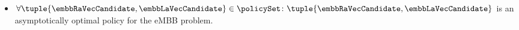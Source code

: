 \begin{frame}
  \begin{itemize}
    \item $\forall\tuple{\embbRaVecCandidate, \embbLaVecCandidate} \in \policySet \colon \tuple{\embbRaVecCandidate, \embbLaVecCandidate}$ is an asymptotically optimal policy for the eMBB problem\proofFootnote.
  \end{itemize}
\end{frame}
